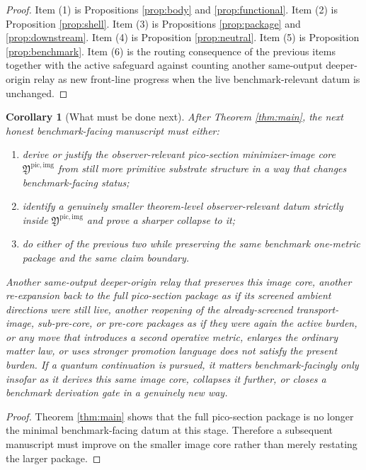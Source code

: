 \documentclass[11pt]{article}
\newcommand{\PicoImageCore}{\mathfrak Y^{\mathrm{pic,img}}}
\newtheorem{corollary}{Corollary}
\begin{document}
\begin{proof}
Item (1) is Propositions \ref{prop:body} and \ref{prop:functional}. Item (2) is Proposition \ref{prop:shell}. Item (3) is Propositions \ref{prop:package} and \ref{prop:downstream}. Item (4) is Proposition \ref{prop:neutral}. Item (5) is Proposition \ref{prop:benchmark}. Item (6) is the routing consequence of the previous items together with the active safeguard against counting another same-output deeper-origin relay as new front-line progress when the live benchmark-relevant datum is unchanged.
\end{proof}

\begin{corollary}[What must be done next]
\label{cor:next}
After Theorem \ref{thm:main}, the next honest benchmark-facing manuscript must either:
\begin{enumerate}
    \item derive or justify the observer-relevant pico-section minimizer-image core \(\PicoImageCore\) from still more primitive substrate structure in a way that changes benchmark-facing status;
    \item identify a genuinely smaller theorem-level observer-relevant datum strictly inside \(\PicoImageCore\) and prove a sharper collapse to it;
    \item do either of the previous two while preserving the same benchmark one-metric package and the same claim boundary.
\end{enumerate}
Another same-output deeper-origin relay that preserves this image core, another re-expansion back to the full pico-section package as if its screened ambient directions were still live, another reopening of the already-screened transport-image, sub-pre-core, or pre-core packages as if they were again the active burden, or any move that introduces a second operative metric, enlarges the ordinary matter law, or uses stronger promotion language does not satisfy the present burden. If a quantum continuation is pursued, it matters benchmark-facingly only insofar as it derives this same image core, collapses it further, or closes a benchmark derivation gate in a genuinely new way.
\end{corollary}

\begin{proof}
Theorem \ref{thm:main} shows that the full pico-section package is no longer the minimal benchmark-facing datum at this stage. Therefore a subsequent manuscript must improve on the smaller image core rather than merely restating the larger package.
\end{proof}
\end{document}
